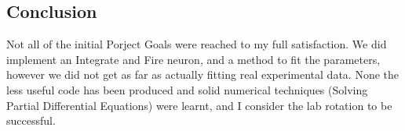 \documentclass[10pt]{article}
\begin{document}
\subsection{Conclusion}

Not all of the initial Porject Goals were reached to my full
satisfaction. We did implement an Integrate and Fire
neuron, and a method to fit the parameters, however we did not get as
far as actually fitting real experimental data. None the less 
useful code has been produced and solid numerical techniques (Solving
Partial Differential Equations) were
learnt, and I consider the lab rotation to be successful. 

{  }
\end{document}
